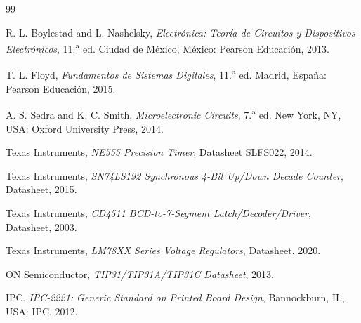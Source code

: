 \documentclass[10pt,onecolumn]{IEEEtran}
\begin{document}
\begin{thebibliography}{99}

 R. L. Boylestad and L. Nashelsky, \emph{Electrónica: Teoría de Circuitos y Dispositivos Electrónicos}, 11.\textsuperscript{a} ed. Ciudad de México, México: Pearson Educación, 2013.

 T. L. Floyd, \emph{Fundamentos de Sistemas Digitales}, 11.\textsuperscript{a} ed. Madrid, España: Pearson Educación, 2015.

 A. S. Sedra and K. C. Smith, \emph{Microelectronic Circuits}, 7.\textsuperscript{a} ed. New York, NY, USA: Oxford University Press, 2014.

 Texas Instruments, \emph{NE555 Precision Timer}, Datasheet SLFS022, 2014.

 Texas Instruments, \emph{SN74LS192 Synchronous 4-Bit Up/Down Decade Counter}, Datasheet, 2015.

 Texas Instruments, \emph{CD4511 BCD-to-7-Segment Latch/Decoder/Driver}, Datasheet, 2003.

 Texas Instruments, \emph{LM78XX Series Voltage Regulators}, Datasheet, 2020.

 ON Semiconductor, \emph{TIP31/TIP31A/TIP31C Datasheet}, 2013.

 IPC, \emph{IPC-2221: Generic Standard on Printed Board Design}, Bannockburn, IL, USA: IPC, 2012.

\end{thebibliography}
\end{document}
